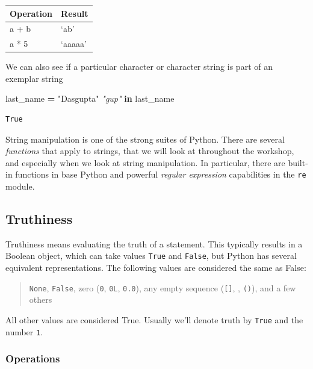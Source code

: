 \documentclass[
  letterpaper,
]{scrbook}
\newenvironment{Shaded}{\begin{snugshade}}{\end{snugshade}}
\newcommand{\CommentTok}[1]{\textcolor[rgb]{0.56,0.35,0.01}{\textit{#1}}}
\newcommand{\KeywordTok}[1]{\textcolor[rgb]{0.13,0.29,0.53}{\textbf{#1}}}
\newcommand{\NormalTok}[1]{#1}
\newcommand{\OperatorTok}[1]{\textcolor[rgb]{0.81,0.36,0.00}{\textbf{#1}}}
\newcommand{\StringTok}[1]{\textcolor[rgb]{0.31,0.60,0.02}{#1}}
\begin{document}
\begin{longtable}[]{@{}ll@{}}
\toprule
Operation & Result\tabularnewline
\midrule
\endhead
a + b & `ab'\tabularnewline
a * 5 & `aaaaa'\tabularnewline
\bottomrule
\end{longtable}

We can also see if a particular character or character string is part of an exemplar string

\begin{Shaded}
\begin{Highlighting}[]
\NormalTok{last_name }\OperatorTok{=} \StringTok{"Dasgupta"}
\CommentTok{"gup"} \KeywordTok{in}\NormalTok{ last_name}
\end{Highlighting}
\end{Shaded}

\begin{verbatim}
True
\end{verbatim}

String manipulation is one of the strong suites of Python.
There are several \emph{functions} that apply to strings, that we will look at throughout the workshop, and especially when we look at string manipulation. In particular, there are built-in functions in base Python and powerful \emph{regular expression} capabilities in the \texttt{re} module.

\hypertarget{truthiness}{%
\subsection{Truthiness}\label{truthiness}}

Truthiness means evaluating the truth of a statement. This typically results in a Boolean object, which can take values \texttt{True} and \texttt{False}, but Python has several equivalent representations. The following values are considered the same as False:

\begin{quote}
\texttt{None}, \texttt{False}, zero (\texttt{0}, \texttt{0L}, \texttt{0.0}), any empty sequence (\texttt{{[}{]}}, \texttt{\textquotesingle{}\textquotesingle{}}, \texttt{()}), and a few others
\end{quote}

All other values are considered True. Usually we'll denote truth by \texttt{True} and the number \texttt{1}.

\hypertarget{operations-1}{%
\subsubsection{Operations}\label{operations-1}}
\end{document}
